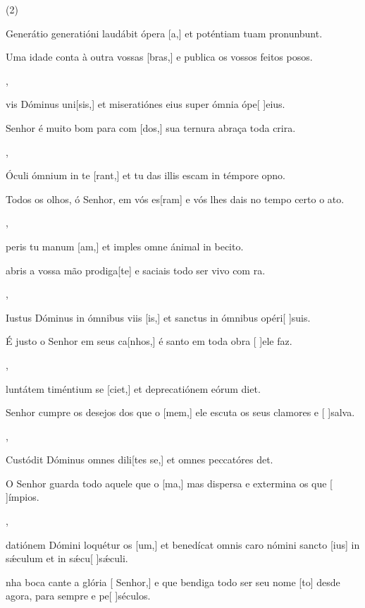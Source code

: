 \SetVersePairs(2){
    {\item {}Generátio generatióni laudábit ópera [a,] et poténtiam tuam pronunbunt.~\Responsorium}%
        {\item {}Uma idade conta à outra vossas [bras,] e publica os vossos feitos posos.~\Responsorium},
    {\item {}vis Dóminus uni[sis,] et miseratiónes eius super ómnia ópe[ ]{e}ius.~\Responsorium}%
        {\item {} Senhor é muito bom para com [dos,] sua ternura abraça toda crira.~\Responsorium},
    {\item {}Óculi ómnium in te [rant,] et tu das illis escam in témpore opno.~\Responsorium}%
        {\item {}Todos os olhos, ó Senhor, em vós es[ram] e vós lhes dais no tempo certo o ato.~\Responsorium},
    {\item {}peris tu manum [am,] et imples omne ánimal in be\-ci\-to.~\Responsorium}%
        {\item {} abris a vossa mão prodiga[te] e saciais todo ser vivo com ra.~\Responsorium},
    {\item {}Iustus Dóminus in ómnibus viis [is,] et sanctus in ómnibus opéri[ ]{su}is.~\Responsorium}%
        {\item {}É justo o Senhor em seus ca[nhos,] é santo em toda obra [ ]{e}le faz.~\Responsorium},
    {\item {}luntátem timéntium se [ciet,] et deprecatiónem eórum diet.~\Responsorium}%
        {\item {} Senhor cumpre os desejos dos que o [mem,] ele escuta os seus clamores e [ ]{sal}va.~\Responsorium},
    {\item {}Custódit Dóminus omnes dili[tes se,] et omnes peccatóres det.~\Responsorium}%
        {\item {}O Senhor guarda todo aquele que o [ma,] mas dispersa e extermina os que [ ]{ím}pios.~\Responsorium},
    {\item {}datiónem Dómini loquétur os [um,] et benedícat omnis caro nómini sancto [ius] in sǽculum et in sǽcu[ ]{sǽ}culi.~\Responsorium}%
        {\item {}nha boca cante a glória [ Senhor,] e que bendiga todo ser seu nome [to] desde agora, para sempre e  pe[ ]{sé}culos.~\Responsorium}
}